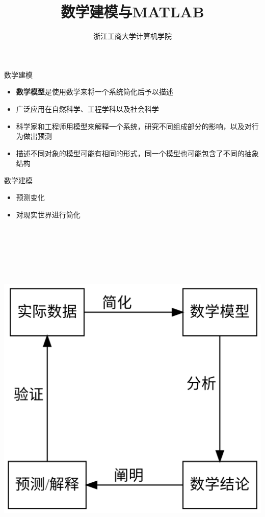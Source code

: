 \documentclass[
  ignorenonframetext,
]{ctexbeamer}
\title{数学建模与MATLAB}
\author{浙江工商大学计算机学院}
\date{}
\providecommand{\tightlist}{%
  \setlength{\itemsep}{0pt}\setlength{\parskip}{0pt}}\usepackage{longtable,booktabs,array}
\begin{document}
\frame{\titlepage}


\begin{frame}{数学建模}
\label{ux6570ux5b66ux5efaux6a21}
\begin{itemize}
\tightlist
\item
  \textbf{数学模型}是使用数学来将一个系统简化后予以描述
\item
  广泛应用在自然科学、工程学科以及社会科学
\item
  科学家和工程师用模型来解释一个系统，研究不同组成部分的影响，以及对行为做出预测
\item
  描述不同对象的模型可能有相同的形式，同一个模型也可能包含了不同的抽象结构
\end{itemize}
\end{frame}

\begin{frame}{数学建模}
\label{ux6570ux5b66ux5efaux6a21-1}
\begin{itemize}
\tightlist
\item
  预测变化
\item
  对现实世界进行简化
\end{itemize}

\includegraphics[width=6.5in,height=7in]{index_files/figure-beamer/dot-figure-1.png}
\end{frame}
\end{document}

